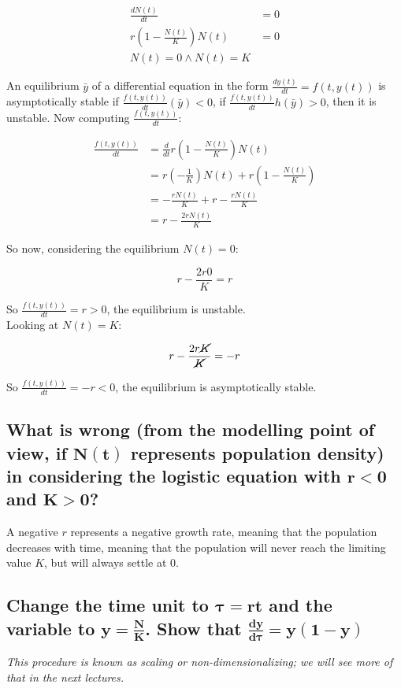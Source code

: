   \begin{align*}
    \frac{dN(t)}{dt} &= 0\\
    r\left(1-\frac{N(t)}{K}\right)N(t) &= 0\\
    N(t)= 0\land N(t)= K
  \end{align*}

  An equilibrium $\bar{y}$ of a differential equation in the form $\frac{dy(t)}{dt} = f(t, y(t))$ is asymptotically stable if $\frac{f(t, y(t))}{dt}(\bar{y}) < 0$, if $\frac{f(t, y(t))}{dt}h(\bar{y})>0$, then it is unstable.
  Now computing $\frac{f(t, y(t))}{dt}$:

  \begin{align*}
    \frac{f(t, y(t))}{dt} &= \frac{d}{dt}r\left(1-\frac{N(t)}{K}\right)N(t)\\
                          &=r\left(-\frac{1}{K}\right)N(t) + r\left(1-\frac{N(t)}{K}\right)\\
                          &=-\frac{rN(t)}{K} + r - \frac{rN(t)}{K}\\
                          &= r-\frac{2rN(t)}{K}
  \end{align*}

  So now, considering the equilibrium $N(t) = 0$:

  $$r - \frac{2r0}{K} = r$$

  So $\frac{f(t, y(t))}{dt} = r >0$, the equilibrium is unstable.\\
  Looking at $N(t) = K$:

  $$r - \frac{2r\cancel{K}}{\cancel{K}} = -r$$

  So $\frac{f(t, y(t))}{dt} = -r <0$, the equilibrium is asymptotically stable.

  \subsection{What is wrong (from the modelling point of view, if $\mathbf{N(t)}$ represents population density) in considering the logistic equation with $\mathbf{r < 0}$ and $\mathbf{K > 0}$?}
  A negative $r$ represents a negative growth rate, meaning that the population decreases with time, meaning that the population will never reach the limiting value $K$, but will always settle at $0$.

  \subsection{Change the time unit to $\mathbf{\tau = rt}$ and the variable to $\mathbf{y = \frac{N}{K}}$. Show that $\mathbf{\frac{dy}{d\tau}=y(1-y)}$}
  \textit{This procedure is known as scaling or non-dimensionalizing; we will see more of that in the next lectures.}\\

